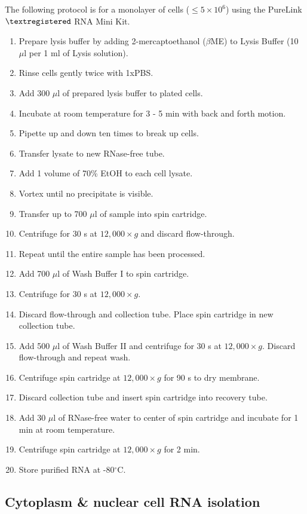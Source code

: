 \noindent The following protocol is for a monolayer of cells ($\le 5 \times 10^6$) using the PureLink$\textregistered$ RNA Mini Kit. 
\begin{enumerate}
\item Prepare lysis buffer by adding 2-mercaptoethanol ($\beta$ME) to Lysis Buffer (10 $\mu$l per 1 ml of Lysis solution).
\item Rinse cells gently twice with 1xPBS.
\item Add 300 $\mu$l of prepared lysis buffer to plated cells.
\item Incubate at room temperature for 3 - 5 min with back and forth motion.
\item Pipette up and down ten times to break up cells.
\item Transfer lysate to new RNase-free tube.
\item Add 1 volume of 70\% EtOH to each cell lysate.
\item Vortex until no precipitate is visible.
\item Transfer up to 700 $\mu$l of sample into spin cartridge.
\item Centrifuge for 30 s at $12,000 \times g$ and discard flow-through\footnotemark.
\item Repeat until the entire sample has been processed.
\item Add 700 $\mu$l of Wash Buffer I to spin cartridge.
\item Centrifuge for 30 s at $12,000 \times g$.
\item Discard flow-through and collection tube. Place spin cartridge in new collection tube.
\item Add 500 $\mu$l of Wash Buffer II and centrifuge for 30 s at $12,000 \times g$. Discard flow-through and repeat wash.
\item Centrifuge spin cartridge at $12,000 \times g$ for 90 s to dry membrane.
\item Discard collection tube and insert spin cartridge into recovery tube.
\item Add 30 $\mu$l of RNase-free water to center of spin cartridge and incubate for 1 min at room temperature.
\item Centrifuge spin cartridge at $12,000 \times g$ for 2 min.
\item Store purified RNA at -80$^{\circ}$C.
\end{enumerate}

\subsection{Cytoplasm \& nuclear cell RNA isolation}


